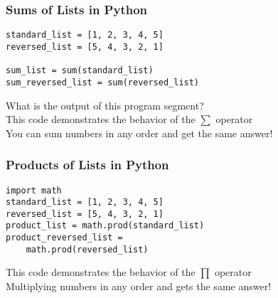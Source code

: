 \documentclass[14pt,aspectratio=169]{beamer}
\begin{document}
%
\begin{frame}[fragile]
  \frametitle{Sums of Lists in Python}
  \begin{minipage}{6in}
    \vspace*{.25in}
    \begin{verbatim}
standard_list = [1, 2, 3, 4, 5]
reversed_list = [5, 4, 3, 2, 1]

sum_list = sum(standard_list)
sum_reversed_list = sum(reversed_list)
    \end{verbatim}
  \end{minipage}
  \vspace*{.05in}
  \begin{center}
    \normalsize \noindent What is the output of this program segment? \\
    \normalsize \noindent This code demonstrates the behavior of the $\sum$
    operator \\
    \normalsize \noindent You can sum numbers in any order and get the same
    answer! \\
  \end{center}
\end{frame}

%
\begin{frame}[fragile]
  \frametitle{Products of Lists in Python}
  \begin{minipage}{6in}
    \vspace*{.25in}
    \begin{verbatim}
import math
standard_list = [1, 2, 3, 4, 5]
reversed_list = [5, 4, 3, 2, 1]
product_list = math.prod(standard_list)
product_reversed_list =
    math.prod(reversed_list)
    \end{verbatim}
  \end{minipage}
  \vspace*{.05in}
  \begin{center}
    \normalsize \noindent This code demonstrates the behavior of the $\prod$
    operator \\
    \normalsize \noindent Multiplying numbers in any order and gets the same
    answer! \\
  \end{center}
\end{frame}
\end{document}
